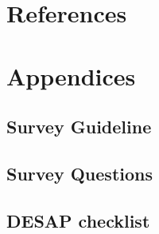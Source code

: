 \documentclass[12pt,a4paper,paper=a4,oneside,titlepage,pdftex]{scrartcl}
\begin{document}
\section*{References}

\renewcommand\refname{\vskip -1cm}


\section*{Appendices}

\subsection*{Survey Guideline}

\subsection*{Survey Questions}

\subsection*{DESAP checklist}
\end{document}
